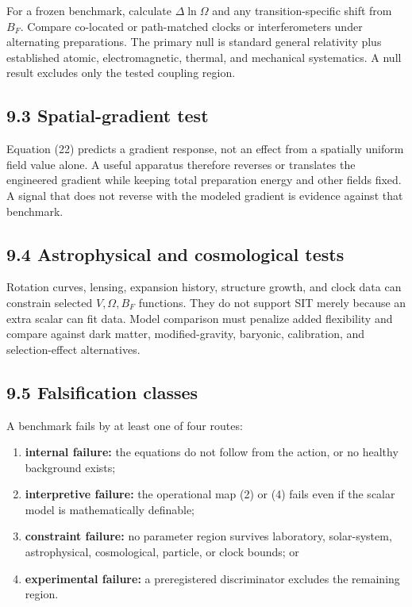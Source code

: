 \documentclass[
  american,
  11pt,
  letterpaper,
]{article}
\providecommand{\tightlist}{%
  \setlength{\itemsep}{0pt}\setlength{\parskip}{0pt}}
\begin{document}
For a frozen benchmark, calculate \(\Delta\ln\Omega\) and any transition-specific shift from \(B_F\). Compare co-located or path-matched clocks or interferometers under alternating preparations. The primary null is standard general relativity plus established atomic, electromagnetic, thermal, and mechanical systematics. A null result excludes only the tested coupling region.

\subsection{9.3 Spatial-gradient test}\label{spatial-gradient-test}

Equation (22) predicts a gradient response, not an effect from a spatially uniform field value alone. A useful apparatus therefore reverses or translates the engineered gradient while keeping total preparation energy and other fields fixed. A signal that does not reverse with the modeled gradient is evidence against that benchmark.

\subsection{9.4 Astrophysical and cosmological tests}\label{astrophysical-and-cosmological-tests}

Rotation curves, lensing, expansion history, structure growth, and clock data can constrain selected \(V,\Omega,B_F\) functions. They do not support SIT merely because an extra scalar can fit data. Model comparison must penalize added flexibility and compare against dark matter, modified-gravity, baryonic, calibration, and selection-effect alternatives.

\subsection{9.5 Falsification classes}\label{falsification-classes}

A benchmark fails by at least one of four routes:

\begin{enumerate}
\def\labelenumi{\arabic{enumi}.}
\tightlist
\item
  \textbf{internal failure:} the equations do not follow from the action, or no healthy background exists;
\item
  \textbf{interpretive failure:} the operational map (2) or (4) fails even if the scalar model is mathematically definable;
\item
  \textbf{constraint failure:} no parameter region survives laboratory, solar-system, astrophysical, cosmological, particle, or clock bounds; or
\item
  \textbf{experimental failure:} a preregistered discriminator excludes the remaining region.
\end{enumerate}
\end{document}
